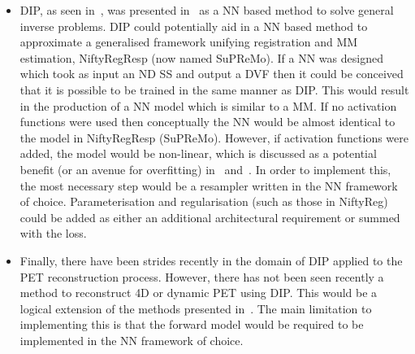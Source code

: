 \begin{itemize}
            \item \gls{DIP}, as seen in~, was presented in~\parencite{Ulyanov2020DeepPrior} as a \gls{NN} based method to solve general inverse problems. \gls{DIP} could potentially aid in a \gls{NN} based method to approximate a generalised framework unifying registration and \gls{MM} estimation, NiftyRegResp (now named \gls{SuPReMo}). If a \gls{NN} was designed which took as input an \gls{ND} \gls{SS} and output a \gls{DVF} then it could be conceived that it is possible to be trained in the same manner as \gls{DIP}. This would result in the production of a \gls{NN} model which is similar to a \gls{MM}. If no activation functions were used then conceptually the \gls{NN} would be almost identical to the model in NiftyRegResp (\gls{SuPReMo}). However, if activation functions were added, the model would be non-linear, which is discussed as a potential benefit (or an avenue for overfitting) in~ and~. In order to implement this, the most necessary step would be a resampler written in the \gls{NN} framework of choice. Parameterisation and regularisation (such as those in NiftyReg) could be added as either an additional architectural requirement or summed with the loss.

            \item Finally, there have been strides recently in the domain of \gls{DIP} applied to the \gls{PET} reconstruction process. However, there has not been seen recently a method to reconstruct \gls{4D} or dynamic \gls{PET} using \gls{DIP}. This would be a logical extension of the methods presented in~. The main limitation to implementing this is that the forward model would be required to be implemented in the \gls{NN} framework of choice.
        \end{itemize}
